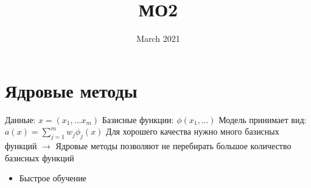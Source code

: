 \documentclass[a4paper, 12pt]{article}
\title{МО2}
\date{March 2021}
\begin{document}
\maketitle

\section{Ядровые методы}

Данные: $x = (x_{1}, ... x_{m})$
\newline
Базисные функции: $\phi(x_{1}, ...)$
\newline
Модель принимает вид: $a(x) = \sum_{j = 1}^{m}w_{j}\phi_{j}(x)$
\newline
Для хорошего качества нужно много базисных функций $\rightarrow$ Ядровые методы позволяют не перебирать большое количество базисных функций

\begin{itemize}
    \item Быстрое обучение
\end{itemize}
\end{document}
